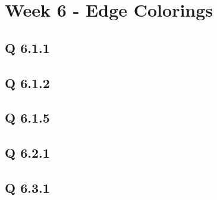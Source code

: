 

\chapter[Week 6 - Edge Colorings]{Week 6 - Edge Colorings}

\section{Q 6.1.1}



\section{Q 6.1.2}

\section{Q 6.1.5}

\section{Q 6.2.1}

\section{Q 6.3.1}

